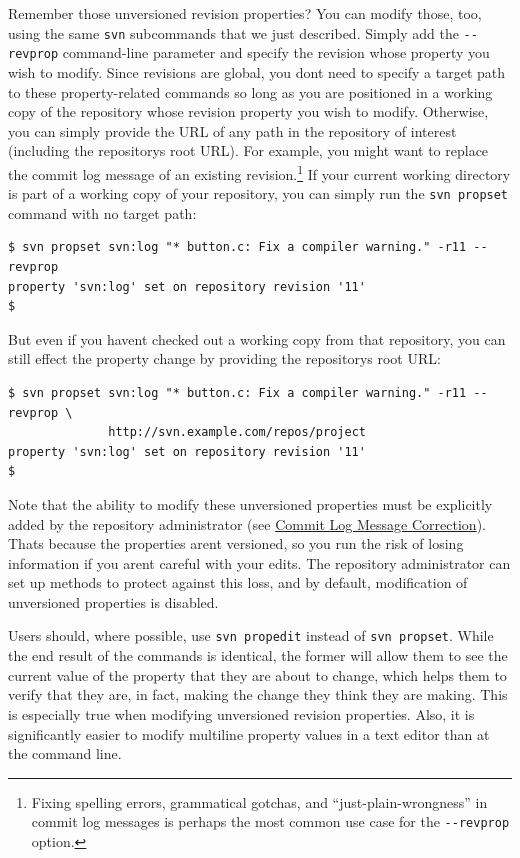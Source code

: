 Remember those unversioned revision properties? You can modify those,
too, using the same \texttt{svn} subcommands that we just described.
Simply add the \texttt{-\/-revprop} command-line parameter and specify
the revision whose property you wish to modify. Since revisions are
global, you don\textquotesingle t need to specify a target path to these
property-related commands so long as you are positioned in a working
copy of the repository whose revision property you wish to modify.
Otherwise, you can simply provide the URL of any path in the repository
of interest (including the repository\textquotesingle s root URL). For
example, you might want to replace the commit log message of an existing
revision.\footnote{Fixing spelling errors, grammatical gotchas, and
  ``just-plain-wrongness'' in commit log messages is perhaps the most
  common use case for the \texttt{-\/-revprop} option.} If your current
working directory is part of a working copy of your repository, you can
simply run the \texttt{svn\ propset} command with no target path:

\begin{verbatim}
$ svn propset svn:log "* button.c: Fix a compiler warning." -r11 --revprop
property 'svn:log' set on repository revision '11'
$
\end{verbatim}

But even if you haven\textquotesingle t checked out a working copy from
that repository, you can still effect the property change by providing
the repository\textquotesingle s root URL:

\begin{verbatim}
$ svn propset svn:log "* button.c: Fix a compiler warning." -r11 --revprop \
              http://svn.example.com/repos/project
property 'svn:log' set on repository revision '11'
$
\end{verbatim}

Note that the ability to modify these unversioned properties must be
explicitly added by the repository administrator (see
\hyperref[svn.reposadmin.maint.setlog]{Commit Log Message Correction}).
That\textquotesingle s because the properties aren\textquotesingle t
versioned, so you run the risk of losing information if you
aren\textquotesingle t careful with your edits. The repository
administrator can set up methods to protect against this loss, and by
default, modification of unversioned properties is disabled.

Users should, where possible, use \texttt{svn\ propedit} instead of
\texttt{svn\ propset}. While the end result of the commands is
identical, the former will allow them to see the current value of the
property that they are about to change, which helps them to verify that
they are, in fact, making the change they think they are making. This is
especially true when modifying unversioned revision properties. Also, it
is significantly easier to modify multiline property values in a text
editor than at the command line.

